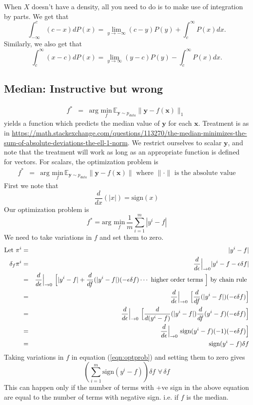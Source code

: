 \documentclass{article}
\newcommand{\beq}{\begin{equation}}
\newcommand{\eeq}{\end{equation}}
\newcommand{\ber}{\begin{eqnarray}}
\newcommand{\eer}{\end{eqnarray}}
\newcommand{\dd}[2]{\frac{d}{d{#2}}{(#1)} }
\newcommand{\ddeps}{\frac{d}{d\epsilon}\Big{|}_{\rightarrow{0}}}
\begin{document}
When $X$ doesn't have a density, all you need to do is to make use of integration by parts. We get that $$\displaystyle \int_{-\infty}^{c} (c-x) dP(x) = \lim_{y \rightarrow -\infty} (c-y) P(y) + \displaystyle \int_{c}^{\infty} P(x) dx.$$ Similarly, we also get that $$\displaystyle \int_{c}^{\infty} (x-c) dP(x) = \lim_{y \rightarrow \infty} (y-c) P(y) - \displaystyle \int_{c}^{\infty} P(x) dx.$$

\subsection{Median: Instructive but wrong}
\ber
f^{*} &=& \text{arg } \underset{f}{\text{min}}\, {\mathbb{E}}_{\pmb{y}\sim{p_{data}}}\|{\pmb{y}}-f(\pmb{x})\|_1 \
\eer
yields a function which predicts the median value of $\pmb{y}$ for each $\pmb{x}$. Treatment is as in \url{https://math.stackexchange.com/questions/113270/the-median-minimizes-the-sum-of-absolute-deviations-the-ell-1-norm}. We restrict ourselves to scalar $\pmb{y}$, and note that the treatment will work as long as an appropriate  function is defined for vectors. For scalars, the optimization problem is
\ber
f^{*} &=& \text{arg } \underset{f}{\text{min}}\, {\mathbb{E}}_{\pmb{y}\sim{p_{data}}}\|{\pmb{y}}-f(\pmb{x})\| \text{ where } \|\cdot\| \text{ is the absolute value}
\eer
First we note that
\beq
\dd{|x|}{x} = \text{sign}(x)
\eeq
Our optimization problem is
\beq
\label{eqn:optprob}
f^{*} = \text{arg } \underset{f}{\text{min}}\, \frac{1}{m}\sum_{i=1}^{m}|y^{i}-f|
\eeq
We need to take variations in $f$ and set them to zero.
\ber
\text{Let }\pi^{i} &=& |y^{i}-f| \\
\delta_f \pi^{i} &=& \ddeps|y^{i}-f-\epsilon\delta{f}|\\
&=& \ddeps \,\, \Big{[} |y^{i}-f| + \dd{|y^{i}-f|}{f}(-\epsilon\delta{f}) \cdots \text{ higher order terms }\Big{]} \text{ by chain rule } \\
&=& \ddeps \,\, \Big{[}  \dd{|y^{i}-f|}{f}(-\epsilon\delta{f})\Big{]}\\
&=& \ddeps \,\, \Big{[} \dd{|y^{i}-f|}{(y^{i}-f)}\dd{y^{i}-f}{f}(-\epsilon\delta{f})\Big{]}\\
&=&  \ddeps \,\, \text{sign}(y^{i}-f)(-1)(-\epsilon\delta{f})\Big{]}\\
&=& \text{sign}(y^{i}-f)\delta{f}  
\eer
Taking variations in $f$ in equation (\ref{eqn:optprob}) and setting them to zero gives
\beq
(\sum_{i=1}^{m}\text{sign}(y^{i}-f))\delta{f} \,\, \forall\, \delta{f}
\eeq
This can happen only if the number of terms with +ve sign in the above equation are equal to the number of terms with negative sign. i.e. if $f$ is the median.
\end{document}
